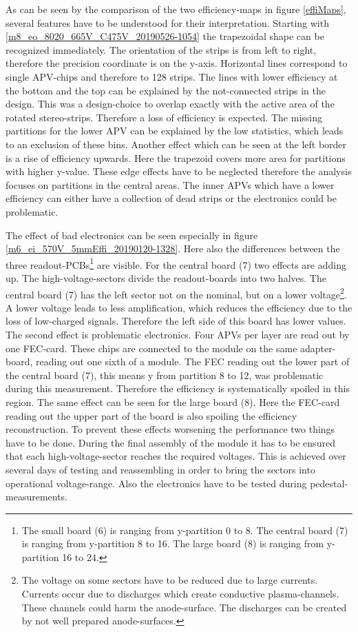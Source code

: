 \documentclass[
twoside,            %
BCOR1.4cm,          %
10pt,               %
headings=normal,    %
headsepline,        %
clearplainpage,		%
final,              %
div=14,
open=right,
bibliography=toc
]{scrreprt}
\begin{document}
As can be seen by the comparison of the two efficiency-maps in figure \ref{effiMaps}, several features have to be understood for their interpretation.
Starting with \ref{m8_eo_8020_665V_C475V_20190526-1054} the trapezoidal shape can be recognized immediately.
The orientation of the strips is from left to right, therefore the precision coordinate is on the y-axis.
Horizontal lines correspond to single APV-chips and therefore to 128 strips.
The lines with lower efficiency at the bottom and the top can be explained by the not-connected strips in the design.
This was a design-choice to overlap exactly with the active area of the rotated stereo-strips.
Therefore a loss of efficiency is expected.
The missing partitions for the lower APV can be explained by the low statistics, which leads to an exclusion of these bins.
Another effect which can be seen at the left border is a rise of efficiency upwards. 
Here the trapezoid covers more area for partitions with higher y-value.
These edge effects have to be neglected therefore the analysis focuses on partitions in the central areas.
The inner APVs which have a lower efficiency can either have a collection of dead strips or the electronics could be problematic.

The effect of bad electronics can be seen especially in figure \ref{m6_ei_570V_5mmEffi_20190120-1328}.
Here also the differences between the three readout-PCBs\footnote{
	The small board (6) is ranging from y-partition 0 to 8.
	The central board (7) is ranging from y-partition 8 to 16.
	The large board (8) is ranging from y-partition 16 to 24.
} are visible.
For the central board (7) two effects are adding up.
The high-voltage-sectors divide the readout-boards into two halves.
The central board (7) has the left sector not on the nominal, but on a lower voltage\footnote{
	The voltage on some sectors have to be reduced due to large currents.
	Currents occur due to discharges which create conductive plasma-channels.
	These channels could harm the anode-surface.
	The discharges can be created by not well prepared anode-surfaces.
}.
A lower voltage leads to less amplification, which reduces the efficiency due to the loss of low-charged signals.
Therefore the left side of this board has lower values.
The second effect is problematic electronics.
Four APVs per layer are read out by one FEC-card.
These chips are connected to the module on the same adapter-board, reading out one sixth of a module.
The FEC reading out the lower part of the central board (7), this means y from partition 8 to 12, was problematic during this measurement.
Therefore the efficiency is systematically spoiled in this region.
The same effect can be seen for the large board (8).
Here the FEC-card reading out the upper part of the board is also spoiling the efficiency reconstruction.
To prevent these effects worsening the performance two things have to be done.
During the final assembly of the module it has to be ensured that each high-voltage-sector reaches the required voltages.
This is achieved over several days of testing and reassembling in order to bring the sectors into operational voltage-range.
Also the electronics have to be tested during pedestal-measurements.
\end{document}
